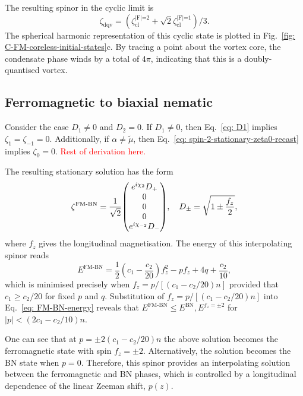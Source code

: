 The resulting spinor in the cyclic limit is
\begin{equation}\label{eq: C-FM-DQV-cyclic-limit}
    \zeta_\text{dqv}
    = \left(\zeta^\text{|F|=2}_\text{cl}
    + \sqrt{2}\zeta^\text{|F|=1}_\text{cl}\right) / 3.
\end{equation}
The spherical harmonic representation of this cyclic state is plotted in
Fig.~\ref{fig: C-FM-coreless-initial-states}c.
By tracing a point about the vortex core, the condensate phase winds by a total
of \(4\pi \), indicating that this is a doubly-quantised vortex.

\subsection{Ferromagnetic to biaxial nematic}
Consider the case \(D_1 \neq 0\) and \(D_2 = 0\).
If \(D_1 \neq 0\), then Eq.~\eqref{eq: D1} implies \(\zeta_1=\zeta_{-1} = 0\).
Additionally, if \(\alpha \neq \tilde{\mu}\),
then Eq.~\eqref{eq: spin-2-stationary-zeta0-recast} implies \(\zeta_0 = 0\).
\textcolor{red}{Rest of derivation here.}

The resulting stationary solution has the form
\begin{equation}\label{eq: FM-BN-interpolating-spinor}
    \zeta^\text{FM-BN} = \frac{1}{\sqrt{2}}\mqty(
    e^{i\chi_2} D_+ \\
    0 \\
    0 \\
    0 \\
    e^{i\chi_{-2}}D_-),
    \quad D_\pm =\sqrt{1 \pm \frac{f_z}{2}},
\end{equation}
where \(f_z\) gives the longitudinal magnetisation.
The energy of this interpolating spinor reads
\begin{equation}\label{eq: FM-BN-energy}
    E^\text{FM-BN} = \frac{1}{2}\left(c_1-\frac{c_2}{20}\right)f_z^2
    - p f_z + 4q + \frac{c_2}{10},
\end{equation}
which is minimised precisely when \(f_z = p / [(c_1-c_2/20)n]\) provided that
\(c_1 \geq c_2/20\) for fixed \(p\) and \(q\).
Substitution of \(f_z = p / [(c_1-c_2/20)n]\) into Eq.~\eqref{eq: FM-BN-energy}
reveals that \(E^\text{FM-BN} \leq E^\text{BN},
E^{f_z=\pm 2}\) for \(|p| < (2c_1-c_2/10)n\).

One can see that at \(p = \pm 2(c_1-c_2/20)n\) the above solution becomes
the ferromagnetic state with spin \(f_z = \pm 2\).
Alternatively, the solution becomes the BN state when \(p=0\).
Therefore, this spinor provides an interpolating solution between the
ferromagnetic and BN phases, which is controlled by a longitudinal dependence of
the linear Zeeman shift, \(p(z)\).

